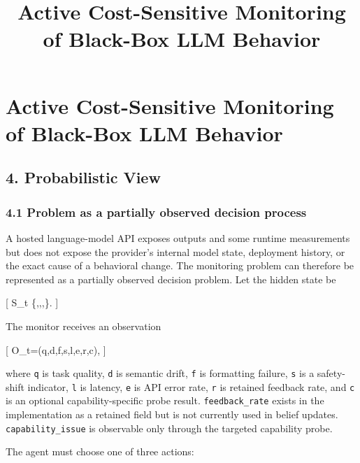 \documentclass[
]{article}
\title{Active Cost-Sensitive Monitoring of Black-Box LLM Behavior}
\author{}
\date{}
\begin{document}
\maketitle

\section{Active Cost-Sensitive Monitoring of Black-Box LLM
Behavior}\label{active-cost-sensitive-monitoring-of-black-box-llm-behavior}

\subsection{4. Probabilistic View}\label{probabilistic-view}

\subsubsection{4.1 Problem as a partially observed decision
process}\label{problem-as-a-partially-observed-decision-process}

A hosted language-model API exposes outputs and some runtime
measurements but does not expose the provider's internal model state,
deployment history, or the exact cause of a behavioral change. The
monitoring problem can therefore be represented as a partially observed
decision problem. Let the hidden state be

{[} S\_t
\in \{,,,\}.
{]}

The monitor receives an observation

{[} O\_t=(q,d,f,s,l,e,r,c), {]}

where \texttt{q} is task quality, \texttt{d} is semantic drift,
\texttt{f} is formatting failure, \texttt{s} is a safety-shift
indicator, \texttt{l} is latency, \texttt{e} is API error rate,
\texttt{r} is retained feedback rate, and \texttt{c} is an optional
capability-specific probe result. \texttt{feedback\_rate} exists in the
implementation as a retained field but is not currently used in belief
updates. \texttt{capability\_issue} is observable only through the
targeted capability probe.

The agent must choose one of three actions:
\end{document}
